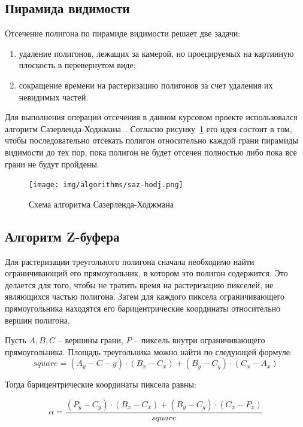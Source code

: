 \subsection{Пирамида видимости}

Отсечение полигона по пирамиде видимости решает две задачи:
\begin{enumerate}
	\item удаление полигонов, лежащих за камерой, но проецируемых на картинную плоскость в перевернутом виде;
	\item сокращение времени на растеризацию полигонов за счет удаления их невидимых частей.
\end{enumerate}

Для выполнения операции отсечения в данном курсовом проекте использовался алгоритм Сазерленда-Ходжмана~\cite{roders}. Согласно рисунку~\ref{fig:saz-hodj} его идея состоит в том, чтобы последовательно отсекать полигон относительно каждой грани пирамиды видимости до тех пор, пока полигон не будет отсечен полностью либо пока все грани не будут пройдены.

\begin{figure}[h]
	\centering
	\texttt{[image: img/algorithms/sаz-hodj.png]}
	\caption{Схема алгоритма Сазерленда-Ходжмана}
	\label{fig:saz-hodj}
\end{figure}

\clearpage

\subsection{Алгоритм Z-буфера}

Для растеризации треугольного полигона сначала необходимо найти ограничивающий его прямоугольник, в котором это полигон содержится. 
Это делается для того, чтобы не тратить время на растеризацию пикселей, не являющихся частью полигона.
Затем для каждого пиксела ограничивающего прямоугольника находятся его барицентрические координаты относительно вершин полигона.

Пусть $A, B, C$ – вершины грани, $P$ – пиксель внутри ограничивающего прямоугольника.
Площадь треугольника можно найти по следующей формуле:
\begin{equation}
	square = (A_y - C-y) \cdot (B_x - C_x) + (B_y - C_y) \cdot (C_x - A_x)
\end{equation}

Тогда барицентрические координаты пиксела равны:

\begin{equation}
	\alpha=\frac{\left(P_y-C_y\right)\cdot\left(B_x-C_x\right)+\left(B_y-C_y\right)\cdot\left(C_x-P_x\right)}{square}
\end{equation}	

